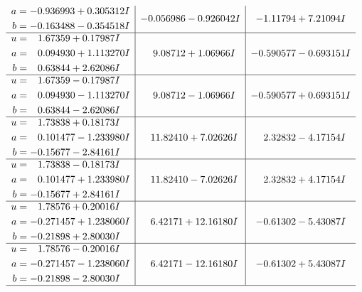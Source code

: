 \documentclass[1p]{elsarticle_modified}
\theoremstyle{definition}
\begin{document}
$$\begin{array}{c|c|c}
\begin{aligned}
a &= -0.936993 + 0.305312 I \\
b &= -0.163488 - 0.354518 I\end{aligned}
 & -0.056986 - 0.926042 I & -1.11794 + 7.21094 I \\ \hline\begin{aligned}
u &= \phantom{-}1.67359 + 0.17987 I \\
a &= \phantom{-}0.094930 + 1.113270 I \\
b &= \phantom{-}0.63844 + 2.62086 I\end{aligned}
 & \phantom{-}9.08712 + 1.06966 I & -0.590577 - 0.693151 I \\ \hline\begin{aligned}
u &= \phantom{-}1.67359 - 0.17987 I \\
a &= \phantom{-}0.094930 - 1.113270 I \\
b &= \phantom{-}0.63844 - 2.62086 I\end{aligned}
 & \phantom{-}9.08712 - 1.06966 I & -0.590577 + 0.693151 I \\ \hline\begin{aligned}
u &= \phantom{-}1.73838 + 0.18173 I \\
a &= \phantom{-}0.101477 - 1.233980 I \\
b &= -0.15677 - 2.84161 I\end{aligned}
 & \phantom{-}11.82410 + 7.02626 I & \phantom{-}2.32832 - 4.17154 I \\ \hline\begin{aligned}
u &= \phantom{-}1.73838 - 0.18173 I \\
a &= \phantom{-}0.101477 + 1.233980 I \\
b &= -0.15677 + 2.84161 I\end{aligned}
 & \phantom{-}11.82410 - 7.02626 I & \phantom{-}2.32832 + 4.17154 I \\ \hline\begin{aligned}
u &= \phantom{-}1.78576 + 0.20016 I \\
a &= -0.271457 + 1.238060 I \\
b &= -0.21898 + 2.80030 I\end{aligned}
 & \phantom{-}6.42171 + 12.16180 I & -0.61302 - 5.43087 I \\ \hline\begin{aligned}
u &= \phantom{-}1.78576 - 0.20016 I \\
a &= -0.271457 - 1.238060 I \\
b &= -0.21898 - 2.80030 I\end{aligned}
 & \phantom{-}6.42171 - 12.16180 I & -0.61302 + 5.43087 I\\
 \hline 
 \end{array}$$\newpage\newpage\renewcommand{\arraystretch}{1}
\end{document}
